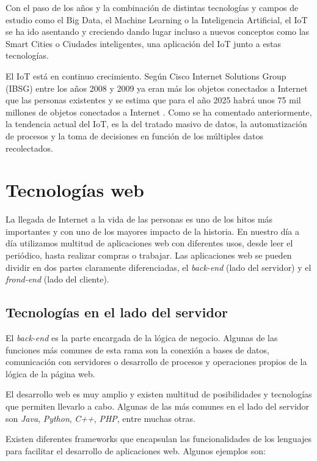 \documentclass[a4paper, 12pt, oneside]{book}
\begin{document}
Con el paso de los años y la combinación de distintas tecnologías y campos de estudio como el Big Data, el Machine Learning o la Inteligencia Artificial, el IoT se ha ido asentando y creciendo dando lugar incluso a nuevos conceptos como las Smart Cities o Ciudades inteligentes, una aplicación del IoT junto a estas tecnologías.

El IoT está en continuo crecimiento. Según Cisco Internet Solutions Group (IBSG) entre los años 2008 y 2009 ya eran más los objetos conectados a Internet que las personas existentes y se estima que para el año 2025 habrá unos 75 mil millones de objetos conectados a Internet \cite{cisco_iot}. Como se ha comentado anteriormente, la tendencia actual del IoT, es la del tratado masivo de datos, la automatización de procesos y la toma de decisiones en función de los múltiples datos recolectados.

\section{Tecnologías web}
\label{sec:tecnologías web}
La llegada de Internet a la vida de las personas es uno de los hitos más importantes y con uno de los mayores impacto de la historia. En nuestro día a día utilizamos multitud de aplicaciones web con diferentes usos, desde leer el periódico, hasta realizar compras o trabajar.
Las aplicaciones web se pueden dividir en dos partes claramente diferenciadas, el \textit{back-end} (lado del servidor) y el \textit{frond-end} (lado del cliente).

\subsection{Tecnologías en el lado del servidor}
\label{subsec:tecnologías en el lado del servidor}
 El \textit{back-end} es la parte encargada de la lógica de negocio. Algunas de las funciones más comunes de esta rama son la conexión a bases de datos, comunicación con servidores o desarrollo de procesos y operaciones propios de la lógica de la página web.
 
El desarrollo web es muy amplio y existen multitud de posibilidades y tecnologías que permiten llevarlo a cabo. Algunas de las más comunes en el lado del servidor son \textit{Java},  \textit{Python}, \textit{C++}, \textit{PHP}, entre muchas otras.

Existen diferentes frameworks que encapsulan las funcionalidades de los lenguajes para facilitar el desarrollo de aplicaciones web. Algunos ejemplos son:
\end{document}
